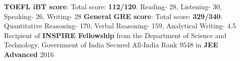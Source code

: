 \textbf{TOEFL iBT score}: Total score: \textbf{112/120}. Reading- 28, Listening- 30, Speaking- 26, Writing- 28\break
\textbf{General GRE score}: Total score: \textbf{329/340}. Quantitative Reasoning- 170, Verbal Reasoning- 159, Analytical Writing- 4.5\break
Recipient of \textbf{INSPIRE Fellowship} from the Department of Science and Technology, Government of India\break
Secured All-India Rank 9548 in \textbf{JEE Advanced} 2016

